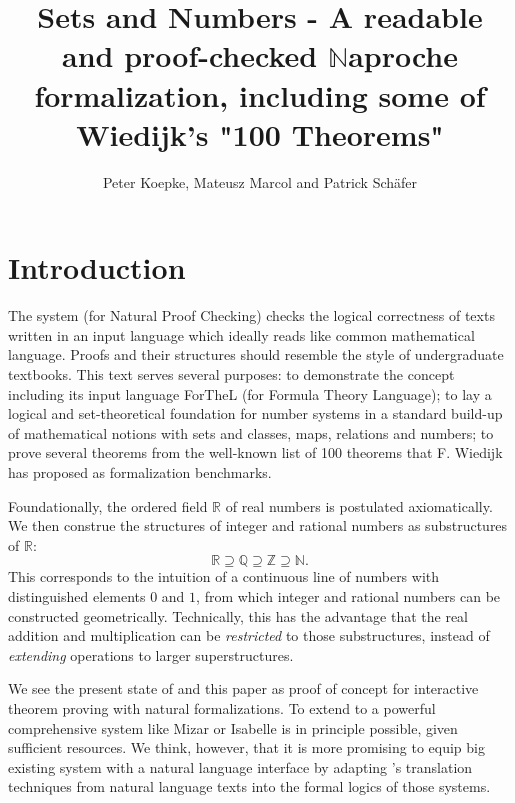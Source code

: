 \documentclass{article}
\begin{document}

\newcommand{\Prod}[3]{#1_{#2} \cdots #1_{#3}}
\newcommand{\Seq}[2]{\{#1,\dots,#2\}}
\newcommand{\FinSet}[3]{\{#1_{#2},\dots,#1_{#3}\}}
\newcommand{\Primes}{\mathbb{P}}


\title{Sets and Numbers - A readable and proof-checked $\mathbb{N}$aproche
formalization,
including some of Wiedijk's "100 Theorems"}

\author{Peter Koepke, Mateusz Marcol and Patrick Schäfer}

\maketitle

\tableofcontents
\newpage

\section*{Introduction}

The \Naproche{} system (for Natural Proof Checking)
checks the logical correctness of texts
written in an input language which ideally reads
like common mathematical language. Proofs and their 
structures should resemble the
style of undergraduate textbooks. 
This text serves several purposes: to demonstrate the 
\Naproche{} concept including its
input language ForTheL (for Formula Theory Language);
to lay a logical and set-theoretical foundation for
number systems in a standard build-up of mathematical notions
with sets and classes, maps, relations and numbers;
to prove several theorems from the well-known list of 100 theorems
that F. Wiedijk has proposed as formalization benchmarks.
 
Foundationally, the ordered field $\mathbb{R}$ of real numbers
is postulated axiomatically. We then construe the structures of integer and
rational numbers as substructures of $\mathbb{R}$:
\[ \mathbb{R} \supseteq \mathbb{Q} \supseteq \mathbb{Z}
\supseteq \mathbb{N}. \]
This corresponds to the intuition of a continuous line of numbers with
distinguished elements $0$ and $1$, from which integer and rational numbers can
be constructed geometrically. Technically, this has the advantage 
that the real addition and multiplication
can be {\em restricted} to those substructures, instead of {\em extending} operations
to larger superstructures.

We see the present state of \Naproche{} and this paper as proof of 
concept for interactive theorem
proving with natural formalizations. To extend \Naproche{} to a powerful comprehensive
system like Mizar or Isabelle is in principle possible, given sufficient resources.
We think, however, that it is more promising to equip big existing
system with a natural language interface by adapting 
\Naproche's translation techniques
from natural language texts into the formal logics of those systems.
\end{document}
